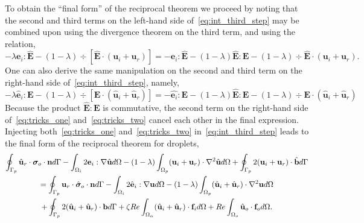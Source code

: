 To obtain the ``final form'' of the reciprocal theorem we proceed by noting that the second and third terms on the left-hand side  of~\ref{eq:int_third_step} may be combined upon using the divergence theorem on the third term, and using the relation, 
\begin{equation}
    - \lambda \textbf{e}_i : \hat{\textbf{E}}
    - (1-\lambda)\div [\hat{\textbf{E}} \cdot (\textbf{u}_i + \textbf{u}_r)]
    =
    - \textbf{e}_i : \hat{\textbf{E}}
    - (1-\lambda) \hat{\textbf{E}}:\textbf{E}
    - (1-\lambda)\div \hat{\textbf{E}} \cdot (\textbf{u}_i + \textbf{u}_r).
    \label{eq:tricks_two}
\end{equation}
One can also derive the same manipulation on the second and third term on the right-hand side of~\ref{eq:int_third_step}, namely,
\begin{equation}
    - \lambda \hat{\textbf{e}}_i : {\textbf{E}}
    - (1-\lambda)\div [{\textbf{E}} \cdot (\hat{\textbf{u}}_i + \hat{\textbf{u}}_r)]
    =
    - \hat{\textbf{e}_i} : {\textbf{E}}
    - (1-\lambda) \hat{\textbf{E}}:\textbf{E}
    - (1-\lambda)\div {\textbf{E}} \cdot (\hat{\textbf{u}}_i + \hat{\textbf{u}}_r)
    \label{eq:tricks_one}
\end{equation}
Because the product $\hat{\textbf{E}} : {\textbf{E}}$ is commutative, the second term on the right-hand side of~\ref{eq:tricks_one} and~\ref{eq:tricks_two} cancel each other in the final expression.  
Injecting both~\ref{eq:tricks_one} and~\ref{eq:tricks_two} in~\ref{eq:int_third_step} leads to the final form of the reciprocal theorem for droplets, 
\begin{multline}
    \intS[p]{\hat{\textbf{u}}_{r} \cdot  \bm\sigma_{o}\cdot \textbf{n}}
    - \intO[i]{2\textbf{e}_i : \grad\hat{\textbf{u}}}
    - (1-\lambda) \intO[p]{(\textbf{u}_{i} + \textbf{u}_r)\cdot \grad^2 \hat{\textbf{u}}}
    + \intS[p]{2(\textbf{u}_{i} + \textbf{u}_r)\cdot \hat{\textbf{b}}}
    \\
    =
    \intS[p]{\textbf{u}_{r}\cdot \hat{\bm\sigma}_{o}\cdot \textbf{n}}
    - \intO[i]{2\hat{\textbf{e}}_i :\grad\textbf{u}}
    - (1-\lambda) \intO[p]{(\hat{\textbf{u}}_{i} + \hat{\textbf{u}}_r) \cdot \grad^2 \textbf{u} }\\ 
    + \intS[p]{2(\hat{\textbf{u}}_{i} + \hat{\textbf{u}}_r) \cdot  \textbf{b}}
    + \zeta Re \intO{(\hat{\textbf{u}}_i+\hat{\textbf{u}}_r)\cdot \textbf{f}_{i}} 
    + Re\intO[o]{\hat{\textbf{u}}_{o}\cdot \textbf{f}_{o}}.
    \label{eq:int_final_step}
\end{multline}
